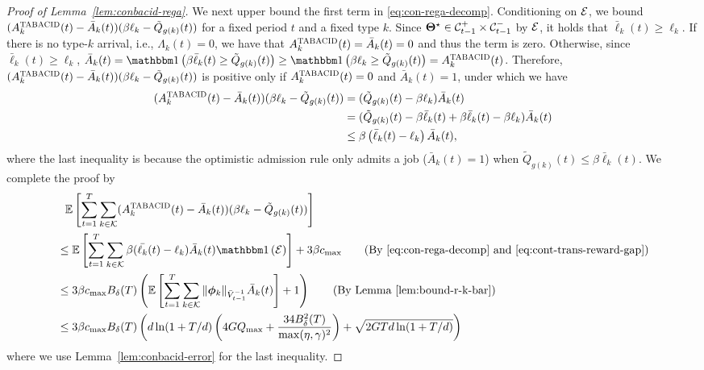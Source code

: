\begin{proof}[Proof of Lemma~\ref{lem:conbacid-rega}]
We next upper bound the first term in \eqref{eq:con-rega-decomp}. Conditioning on $\mathcal{E}$, we bound $(A_k^{\textsc{TABACID}}(t) - \bar{A}_k(t))(\beta \ell_k-\tilde{Q}_{g(k)}(t))$ for a fixed period $t$ and a fixed type $k$. Since $\boldsymbol{\Theta}^\star \in \mathcal{C}^+_{t-1} \times \mathcal{C}^-_{t-1}$ by $\mathcal{E}$, it holds that $\bar{\ell}_k(t) \geq \ell_k$. If there is no type-$k$ arrival, i.e., $\Lambda_k(t) = 0$, we have that $A_k^{\textsc{TABACID}}(t) = \bar{A}_k(t) = 0$ and thus the term is zero. Otherwise, since $\bar{\ell}_k(t) \geq \ell_k$, $\bar{A}_k(t) = \indic{\beta \bar{\ell}_k(t) \geq \tilde{Q}_{g(k)}(t)} \geq \indic{\beta \ell_k \geq \tilde{Q}_{g(k)}(t)} = A_k^{\tabacid}(t)$. Therefore, $(A_k^{\textsc{TABACID}}(t) - \bar{A}_k(t))(\beta \ell_k-\tilde{Q}_{g(k)}(t))$ is positive only if $A_k^{\textsc{TABACID}}(t) = 0$ and $\bar{A}_k(t) = 1$, under which we have
\begin{align}
(A_k^{\textsc{TABACID}}(t) - \bar{A}_k(t))(\beta \ell_k-\tilde{Q}_{g(k)}(t)) &= (\tilde{Q}_{g(k)}(t) - \beta \ell_k)\bar{A}_k(t) \nonumber\\
&= (\tilde{Q}_{g(k)}(t) - \beta \bar{\ell}_k(t) + \beta \bar{\ell}_k(t) - \beta \ell_k)\bar{A}_k(t) \nonumber\\
&\leq \beta \left(\bar{\ell}_k(t) - \ell_k\right)\bar{A}_k(t), \label{eq:cont-trans-reward-gap}
\end{align}
where the last inequality is because the optimistic admission rule only admits a job ($\bar{A}_k(t) = 1$) when $\tilde{Q}_{g(k)}(t) \leq \beta \bar{\ell}_k(t)$. We complete the proof by
\begin{align*}
&\hspace{0.1in}\expect{\sum_{t=1}^T \sum_{k\in\set{K}} (A_k^{\tabacid}(t) - \bar{A}_k(t))(\beta \ell_k-\tilde{Q}_{g(k)}(t))} \\
&\leq \expect{\sum_{t=1}^T \sum_{k \in \set{K}} \beta (\bar{\ell_k}(t)-\ell_k)\bar{A}_k(t)\indic{\set{E}}} + 3\beta c_{\max} \tag{By \eqref{eq:con-rega-decomp} and \eqref{eq:cont-trans-reward-gap}}  \\
&\leq 3\beta c_{\max}B_{\delta}(T)\left(\expect{\sum_{t=1}^T \sum_{k \in \set{K}} \|\bphi_k\|_{\bar{V}_{t-1}^{-1}}\bar{A}_k(t)} + 1\right) \tag{By Lemma~\ref{lem:bound-r-k-bar}} \\
&\leq 3\beta c_{\max}B_{\delta}(T)\left(d\ln(1+T/d)\left(4GQ_{\max} + \frac{34B_{\delta}^2(T)}{\max(\eta,\gamma)^2}\right) + \sqrt{2GTd\ln(1+T/d)}\right)
\end{align*} where we use Lemma~\ref{lem:conbacid-error} for the last inequality.
\end{proof}

